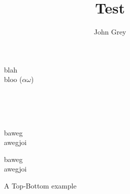 \documentclass[12pt]{article}
\title{Test}
\author{John Grey}
\begin{document}
\begin{figure}
  \begin{eventchain}[start=5, dist=0.5cm]
    \state
    \begin{event}[name=Event, dist=2cm]
      blah \\
      bloo ($ \alpha \omega $) \\
    \end{event}
    \begin{fluents}[name=Fluents, dist=4cm]
       \\
       \\
       \\
    \end{fluents}
    \begin{event}[name=Event]
      baweg \\
      awegjoi \\
    \end{event}
    \begin{event}[name=Event]
      baweg \\
      awegjoi \\
    \end{event}
  \end{eventchain}
  \caption{A Top-Bottom example}
\end{figure}

\pagebreak
\end{document}
